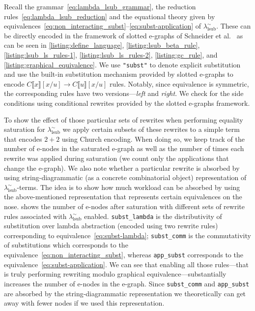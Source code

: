 Recall the grammar~\eqref{eq:lambda_lsub_grammar}, the reduction rules~\eqref{eq:lambda_lsub_reduction} and the equational theory given by equivalences~\eqref{eq:non_interacting_subst}--\eqref{eq:subst-application} of $\lambda_{\text{lsub}}^{\sim}$.
These can be directly encoded in the framework of slotted e-graphs of Schneider et al.~\cite{slotted-egraphs} as can be seen in \cref{listing:define_language}, \cref{listing:lsub_beta_rule}, \cref{listing:lsub_ls_rules-1}, \cref{listing:lsub_ls_rules-2}, \cref{listing:gc_rule}, and \cref{listing:graphical_equivalence}.
We use \texttt{"subst"} to denote explicit substitution and use the built-in substitution mechanism provided by slotted e-graphs to encode $C\llbracket x \rrbracket[x / u] \to C\llbracket u \rrbracket[x/u]$ rules.
Notably, since equivalence is symmetric, the corresponding rules have two versions---\textit{left} and \textit{right}.
We check for the side conditions using conditional rewrites provided by the slotted e-graphs framework.

To show the effect of those particular sets of rewrites when performing equality saturation for $\lambda_{\text{lsub}}^{\sim}$ we apply certain subsets of these rewrites to a simple term that encodes $2 + 2$ using Church encoding.
When doing so, we keep track of the number of e-nodes in the saturated e-graph as well as the number of times each rewrite was applied during saturation (we count only the applications that change the e-graph).
We also note whether a particular rewrite is absorbed by using string-diagrammatic (as a concrete combinatorial object) representation of $\lambda_{\text{lsub}}^{\sim}$-terms.
The idea is to show how much workload can be absorbed by using the above-mentioned representation that represents certain equivalences on the nose.
 shows the number of e-nodes after saturation with different sets of rewrite rules associated with $\lambda_{\text{lsub}}^{\sim}$ enabled.
\texttt{subst\_lambda} is the distributivity of substitution over lambda abstraction (encoded using two rewrite rules) corresponding to equivalence~\eqref{eq:subst-lambda}; \texttt{subst\_comm} is the commutativity of substitutions which corresponds to the equivalence~\eqref{eq:non_interacting_subst}, whereas \texttt{app\_subst} corresponds to the equivalence~\eqref{eq:subst-application}.
We can see that enabling all those rules---that is truly performing rewriting modulo graphical equivalence---substantially increases the number of e-nodes in the e-graph.
Since \texttt{subst\_comm} and \texttt{app\_subst} are absorbed by the string-diagrammatic representation we theoretically can get away with fewer nodes if we used this representation.

